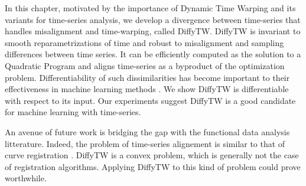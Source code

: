 In this chapter, motivated by the importance of Dynamic Time Warping and its variants for time-series analysis, we develop a divergence between time-series that handles misalignment and time-warping, called DiffyTW. DiffyTW is invariant to smooth reparametrizations of time and robust to misalignment and sampling differences between time series. It can be efficiently computed as the solution to a Quadratic Program and aligns time-series as a byproduct of the optimization problem. Differentiability of such dissimilarities has become important to their effectiveness in machine learning methods \citep{soft-dtw}. We show DiffyTW is differentiable with respect to its input. Our experiments suggest DiffyTW is a good candidate for machine learning with time-series.

An avenue of future work is bridging the gap with the functional data analysis litterature. Indeed, the problem of time-series alignement is similar to that of curve registration \citep{curve-moments}. DiffyTW is a convex problem, which is generally not the case of registration algorithms. Applying DiffyTW to this kind of problem could prove worthwhile.
